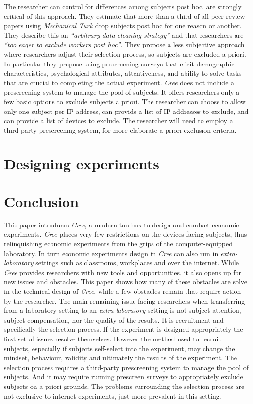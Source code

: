 \documentclass[preprint, 12pt]{elsarticle}
\newcommand{\Cree}{\emph{Cree}\xspace}
\begin{document}
The researcher can control for differences among subjects post hoc. \citet[p. 121]{Chandler_Mueller_Paolacci_2014} are strongly critical of this approach. They estimate that more than a third of all peer-review papers using \emph{Mechanical Turk} drop subjects post hoc for one reason or another. They describe this an \emph{``arbitrary data-cleaning strategy''} and that researchers are \emph{``too eager to exclude workers post hoc''}. They propose a less subjective approach where researchers adjust their selection process, so subjects are excluded a priori. In particular they propose using prescreening surveys that elicit demographic characteristics, psychological attributes, attentiveness, and ability to solve tasks that are crucial to completing the actual experiment. \Cree does not include a prescreening system to manage the pool of subjects. It offers researchers only a few basic options to exclude subjects a priori. The researcher can choose to allow only one subject per IP address, can provide a list of IP addresses to exclude, and can provide a list of devices to exclude. The researcher will need to employ a third-party prescreening system, for more elaborate a priori exclusion criteria.

\section{Designing experiments}
\label{S:Designing}

\section{Conclusion}
\label{S:Conclusion}

This paper introduces \Cree, a modern toolbox to design and conduct economic experiments. \Cree places very few restrictions on the devices facing subjects, thus relinquishing economic experiments from the grips of the computer-equipped laboratory. In turn economic experiments design in \Cree can also run in \emph{extra-laboratory} settings such as classrooms, workplaces and over the internet. While \Cree provides researchers with new tools and opportunities, it also opens up for new issues and obstacles. This paper shows how many of these obstacles are solve in the technical design of \Cree, while a few obstacles remain that require action by the researcher. The main remaining issue facing researchers when transferring from a laboratory setting to an \emph{extra-laboratory} setting is not subject attention, subject compensation, nor the quality of the results. It is recruitment and specifically the selection process. If the experiment is designed appropriately the first set of issues resolve themselves. However the method used to recruit subjects, especially if subjects self-select into the experiment, may change the mindset, behaviour, validity and ultimately the results of the experiment. The selection process requires a third-party prescreening system to manage the pool of subjects. And it may require running prescreen surveys to appropriately exclude subjects on a priori grounds. The problems surrounding the selection process are not exclusive to internet experiments, just more prevalent in this setting.
\end{document}
